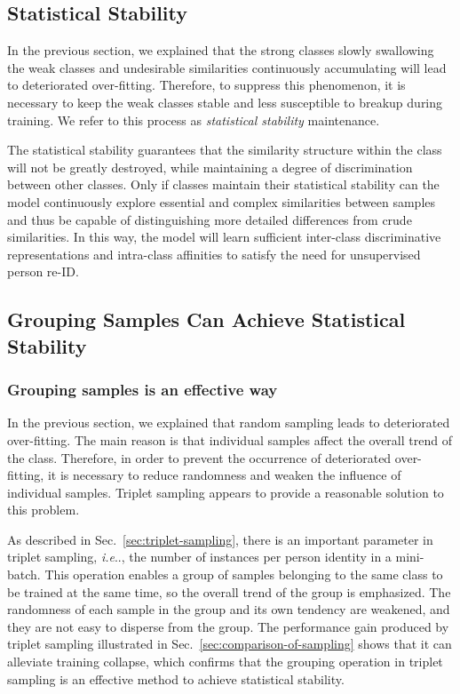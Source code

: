 \documentclass[lettersize,journal]{IEEEtran}
\makeatletter
\DeclareRobustCommand\onedot{\futurelet\@let@token\@onedot}
\def\@onedot{\ifx\@let@token.\else.\null\fi\xspace}
\def\ie{\emph{i.e}\onedot} \def\Ie{\emph{I.e}\onedot}
\makeatother
\begin{document}
\subsection{Statistical Stability} \label{sec:statistical-stability}
In the previous section, we explained that the strong classes slowly swallowing the weak classes and undesirable similarities continuously accumulating will lead to deteriorated over-fitting.  
Therefore, to suppress this phenomenon, it is necessary to keep the weak classes stable and less susceptible to breakup during training.
We refer to this process as \emph{statistical stability} maintenance.

The statistical stability guarantees that the similarity structure within the class will not be greatly destroyed, while maintaining a degree of discrimination between other classes. Only if classes maintain their statistical stability can the model continuously explore essential and complex similarities between samples and thus be capable of distinguishing more detailed differences from crude similarities. In this way, the model will learn sufficient inter-class discriminative representations and intra-class affinities to satisfy the need for unsupervised person re-ID. 

\subsection{Grouping Samples Can Achieve Statistical Stability} \label{sec:group-samples-can-achieve}

\subsubsection{Grouping samples is an effective way}
In the previous section, we explained that random sampling leads to deteriorated over-fitting. The main reason is that individual samples affect the overall trend of the class. Therefore, in order to prevent the occurrence of deteriorated over-fitting, it is necessary to reduce randomness and weaken the influence of individual samples. Triplet sampling appears to provide a reasonable solution to this problem.

As described in Sec.~\ref{sec:triplet-sampling}, there is an important parameter  in triplet sampling, \ie, the number of instances per person identity in a mini-batch. This operation enables a group of samples belonging to the same class to be trained at the same time, so the overall trend of the group is emphasized. The randomness of each sample in the group and its own tendency are weakened, and they are not easy to disperse from the group.
The performance gain produced by triplet sampling illustrated in Sec.~\ref{sec:comparison-of-sampling} shows that it can alleviate training collapse, which confirms that the grouping operation in triplet sampling is an effective method to achieve statistical stability. 
\end{document}
